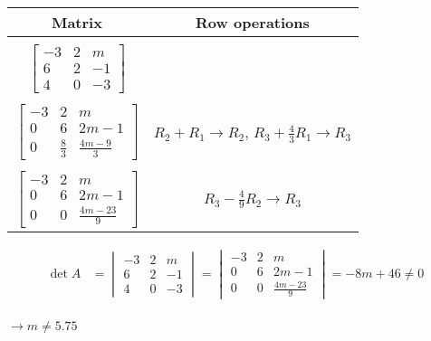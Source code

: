 \documentclass{article}
\begin{document}
\begin{flushleft}
\begin{center}
\begin{table}[h]
\begin{tabular}{c|c}
				Matrix & Row operations
				\\ 
				\hline    	 
				\\
				$\begin{bmatrix}
				-3 & 2           & m               \\
				6  & 2           & -1              \\
				4  & 0           & -3              
				\end{bmatrix}$  \\ \\
				$\begin{bmatrix}
				-3 & 2           & m               \\
				0  & 6           & 2m-1            \\
				0  & \frac{8}{3} & \frac{4m-9}{3}  
				\end{bmatrix}$ & $R_2+R_1 \to R_2$, $R_3+\frac{4}{3}R_1 \to R_3$ \\ \\
				$\begin{bmatrix}
				-3 & 2           & m               \\
				0  & 6           & 2m-1            \\
				0  & 0           & \frac{4m-23}{9} 
				\end{bmatrix}$ & $R_3 - \frac{4}{9}R_2 \to R_3$
			\end{tabular}
		\end{table}
		\begin{align*}        
			\det A &= \begin{vmatrix}
			-3 & 2 & m               \\
			6  & 2 & -1              \\
			4  & 0 & -3              
			\end{vmatrix}
			= \begin{vmatrix}
			-3 & 2 & m               \\
			0  & 6 & 2m-1            \\
			0  & 0 & \frac{4m-23}{9} 
			\end{vmatrix} 
			= -8m + 46 \neq 0 
		\end{align*} \\[2.5pt]
		\colorbox{gray!20}{$\longrightarrow m \neq 5.75$}
	\end{center}
	
\end{flushleft}
\end{document}
